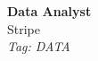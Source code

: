 \documentclass[11pt]{article}
\begin{document}
\begin{center}
  {\LARGE \textbf{Data Analyst}} \\[4pt]
  {\large Stripe} \\[2pt]
  {\small \textit{Tag: DATA}}
\end{center}

\vspace{1em}
\noindent
\end{document}
